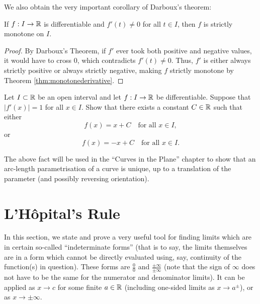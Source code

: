 \documentclass[../analysis1.tex]{subfiles}
\begin{document}
We also obtain the very important corollary of Darboux's theorem:

\begin{corollary}
\label{cor:nvm}
    \begin{shaded*}
        If $f:I\to\mathbb{R}$ is differentiable and $f'(t) \neq 0$ for all $t \in I$, then $f$ is strictly monotone on $I$.
    \end{shaded*}
\end{corollary}
\begin{proof}
    By Darboux's Theorem, if $f'$ ever took both positive and negative values, it would have to cross $0$, which contradicts $f'(t) \neq 0$. Thus, $f'$ is either always strictly positive or always strictly negative, making $f$ strictly monotone by Theorem \ref{thm:monotonederivative}.
\end{proof}

\begin{exercise*}
    Let $I\subset\mathbb{R}$ be an open interval and let $f:I\to\mathbb{R}$ be differentiable. Suppose that $|f'(x)|=1$ for all $x\in I$. Show that there exists a constant $C\in\mathbb{R}$ such that either
    \[f(x)=x+C\quad\text{for all }x\in I,\]
    or
    \[f(x)=-x+C\quad\text{for all }x\in I.\]
\end{exercise*}
The above fact will be used in the ``Curves in the Plane'' chapter to show that an arc-length parametrisation of a curve is unique, up to a translation of the parameter (and possibly reversing orientation).


\section{L'Hôpital's Rule}

In this section, we state and prove a very useful tool for finding limits which are in certain so-called ``indeterminate forms'' (that is to say, the limits themselves are in a form which cannot be directly evaluated using, say, continuity of the function(s) in question). These forms are $\frac{0}{0}$ and $\frac{\pm \infty}{\pm \infty}$ (note that the sign of $\infty$ does not have to be the same for the numerator and denominator limits). It can be applied as $x\to c$ for some finite $a\in\mathbb{R}$ (including one-sided limits as $x\to a^\pm$), or as $x\to \pm \infty$.
\end{document}
